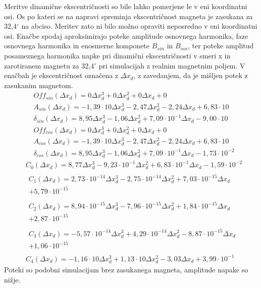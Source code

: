 Meritve dinamične ekscentričnosti so bile lahko pomerjene le v eni koordinatni osi. Os po kateri se na napravi spreminja ekscentričnost magneta je zasukana za 32,4$^\circ$ na abciso. Meritev zato ni bilo možno opraviti neposredno v eni koordinatni osi. Enačbe spodaj aproksimirajo poteke amplitude osnovnega harmonika, faze osnovnega harmonika in enosmerne komponete $B_{sin}$ in $B_{cos}$, ter poteke amplitud posameznega harmonika napke pri dinamični ekscentričnosti v smeri x in zarotiranem magnetu za 32,4$^\circ$ pri simulacijah z realnim magnetnim poljem. V enačbah je ekscentričnost označena z $\Delta x_{d}$, z zavedanjem, da je mišljen potek z zasukanim magnetom. 
\begin{eqnarray}
&Off_{sin}(\Delta x_d) = 0\Delta x_d^{3}+0\Delta x_d^{2}+0\Delta x_d+0 \\
&A_{sin}(\Delta x_d) =-1,39\cdot 10\Delta x_d^{3}-2,47\Delta x_d^{2}-2,24\Delta x_d+6,83\cdot 10 \\                                      
&\delta_{sin}(\Delta x_d) =8,95\Delta x_d^{3}-1,06\Delta x_d^{2}+7,09\cdot 10^{-1}\Delta x_d-9,00\cdot 10 \\                             
&Off_{cos}(\Delta x_d) = 0\Delta x_d^{3}+0\Delta x_d^{2}+0\Delta x_d+0 \\
&A_{cos}(\Delta x_d) =-1,39\cdot 10\Delta x_d^{3}-2,47\Delta x_d^{2}-2,24\Delta x_d+6,83\cdot 10 \\                                      
&\delta_{cos}(\Delta x_d) =8,95\Delta x_d^{3}-1,06\Delta x_d^{2}+7,09\cdot 10^{-1}\Delta x_d-1,73\cdot 10^{-2} 
\end{eqnarray}
\begin{eqnarray}
&C_0(\Delta x_d) =8,77\Delta x_d^{3}-9,23\cdot 10^{-1}\Delta x_d^{2}+6,83\cdot 10^{-1}\Delta x_d-1,59\cdot 10^{-2} \\                  
&\begin{split}C_1(\Delta x_d) =2,73\cdot 10^{-14}\Delta x_d^{3}-2,75\cdot 10^{-14}\Delta x_d^{2}+7,03\cdot 10^{-15}\Delta x_d\\+5,79\cdot 10^{-15}\end{split} \\ 
&\begin{split}C_2(\Delta x_d) =8,94\cdot 10^{-15}\Delta x_d^{3}-7,96\cdot 10^{-15}\Delta x_d^{2}+1,84\cdot 10^{-15}\Delta x_d\\+2,87\cdot 10^{-15}\end{split} \\ 
&\begin{split}C_3(\Delta x_d) =-5,57\cdot 10^{-14}\Delta x_d^{3}+4,29\cdot 10^{-14}\Delta x_d^{2}-8,87\cdot 10^{-15}\Delta x_d\\+1,06\cdot 10^{-15}\end{split} \\
&C_4(\Delta x_d) =-1,16\cdot 10\Delta x_d^{3}+1,13\cdot 10\Delta x_d^{2}-3,03\Delta x_d+3,99\cdot 10^{-1} 
\end{eqnarray}
Poteki so podobni simulacijam brez zasukanega magneta, amplitude napake so nižje.


